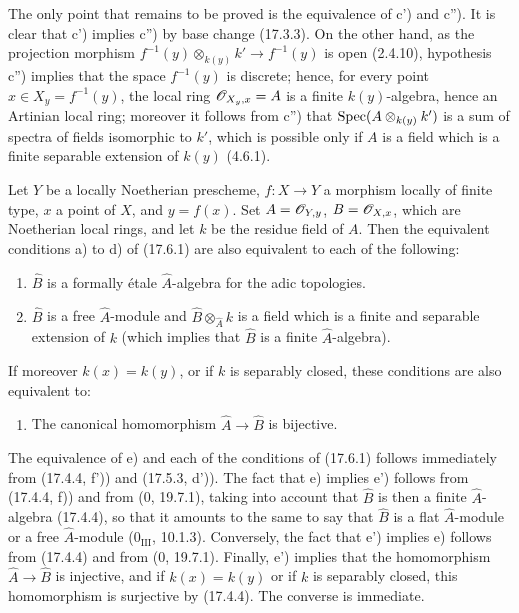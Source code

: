 The only point that remains to be proved is the equivalence of c') and c''). It is clear that c') implies c'') by base change (17.3.3). On the other hand, as the projection morphism $f^{-1}(y)\otimes_{k(y)}k'\to f^{-1}(y)$ is open (2.4.10), hypothesis c'') implies that the space $f^{-1}(y)$ is discrete; hence, for every point $x\in X_y=f^{-1}(y)$, the local ring $\mathscr{O}_{X_y,x}=A$ is a finite $k(y)$-algebra, hence an Artinian local ring; moreover it follows from c'') that $\operatorname{Spec}(A\otimes_{k(y)}k')$ is a sum of spectra of fields isomorphic to $k'$, which is possible only if $A$ is a field which is a finite separable extension of $k(y)$ (4.6.1).

\begin{proposition}[17.6.3]
\label{IV.17.6.3}
Let $Y$ be a locally Noetherian prescheme, $f:X\to Y$ a morphism locally of finite type, $x$ a point of $X$, and $y=f(x)$. Set $A=\mathscr{O}_{Y,y}$, $B=\mathscr{O}_{X,x}$, which are Noetherian local rings, and let $k$ be the residue field of $A$. Then the equivalent conditions a) to d) of (17.6.1) are also equivalent to each of the following:
\begin{enumerate}
  \item[e)] $\widehat B$ is a formally étale $\widehat A$-algebra for the adic topologies.
  \item[e')] $\widehat B$ is a free $\widehat A$-module and $\widehat B\otimes_{\widehat A}k$ is a field which is a finite and separable extension of $k$ (which implies that $\widehat B$ is a finite $\widehat A$-algebra).
\end{enumerate}
If moreover $k(x)=k(y)$, or if $k$ is separably closed, these conditions are also equivalent to:
\begin{enumerate}
  \item[e'')] The canonical homomorphism $\widehat A\to\widehat B$ is bijective.
\end{enumerate}
\end{proposition}

The equivalence of e) and each of the conditions of (17.6.1) follows immediately from (17.4.4, f')) and (17.5.3, d')). The fact that e) implies e') follows from (17.4.4, f)) and from (0, 19.7.1), taking into account that $\widehat B$ is then a finite $\widehat A$-algebra (17.4.4), so that it amounts to the same to say that $\widehat B$ is a flat $\widehat A$-module or a free $\widehat A$-module ($0_{\mathrm{III}}$, 10.1.3). Conversely, the fact that e') implies e) follows from (17.4.4) and from (0, 19.7.1). Finally, e') implies that the homomorphism $\widehat A\to\widehat B$ is injective, and if $k(x)=k(y)$ or if $k$ is separably closed, this homomorphism is surjective by (17.4.4). The converse is immediate.

